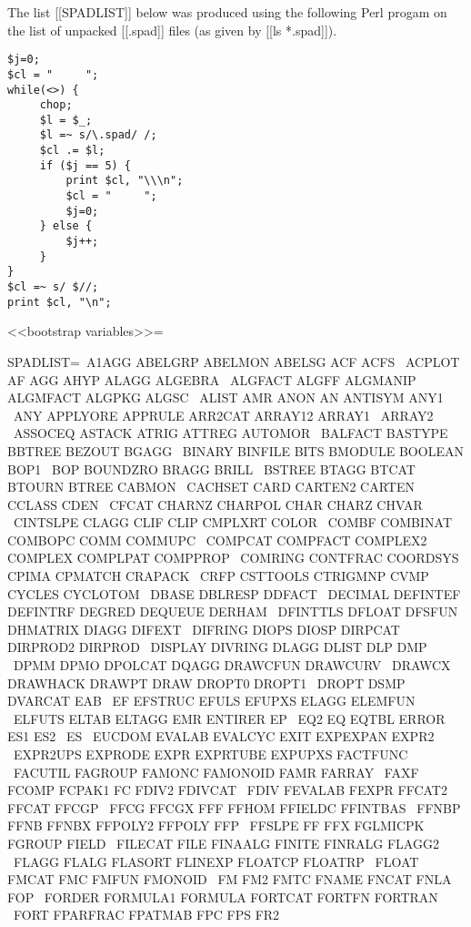 \documentclass{article}
\begin{document}
The list [[SPADLIST]] below was produced using the following Perl
progam on the list of unpacked [[.spad]] files (as given by [[ls *.spad]]).
\begin{verbatim}
$j=0;
$cl = "     ";
while(<>) {
     chop;
     $l = $_;
     $l =~ s/\.spad/ /;
     $cl .= $l;
     if ($j == 5) {
         print $cl, "\\\n";
         $cl = "     ";
         $j=0;
     } else {
         $j++;
     }
}
$cl =~ s/ $//;
print $cl, "\n";
\end{verbatim}

<<bootstrap variables>>=

SPADLIST=\
     A1AGG ABELGRP ABELMON ABELSG ACF ACFS \
     ACPLOT AF AGG AHYP ALAGG ALGEBRA \
     ALGFACT ALGFF ALGMANIP ALGMFACT ALGPKG ALGSC \
     ALIST AMR ANON AN ANTISYM ANY1 \
     ANY APPLYORE APPRULE ARR2CAT ARRAY12 ARRAY1 \
     ARRAY2 \
     ASSOCEQ ASTACK ATRIG ATTREG AUTOMOR \
     BALFACT BASTYPE BBTREE BEZOUT BGAGG \
     BINARY BINFILE BITS BMODULE BOOLEAN BOP1 \
     BOP BOUNDZRO BRAGG BRILL \
     BSTREE BTAGG BTCAT BTOURN BTREE CABMON \
     CACHSET CARD CARTEN2 CARTEN CCLASS CDEN \
     CFCAT CHARNZ CHARPOL CHAR CHARZ CHVAR \
     CINTSLPE CLAGG CLIF CLIP CMPLXRT COLOR \
     COMBF COMBINAT COMBOPC COMM COMMUPC \
     COMPCAT COMPFACT COMPLEX2 COMPLEX COMPLPAT COMPPROP \
     COMRING CONTFRAC COORDSYS CPIMA CPMATCH CRAPACK \
     CRFP CSTTOOLS CTRIGMNP CVMP CYCLES CYCLOTOM \
     DBASE DBLRESP DDFACT \
     DECIMAL DEFINTEF DEFINTRF DEGRED DEQUEUE DERHAM \
     DFINTTLS DFLOAT DFSFUN DHMATRIX DIAGG DIFEXT \
     DIFRING DIOPS DIOSP DIRPCAT DIRPROD2 DIRPROD \
     DISPLAY DIVRING DLAGG DLIST DLP DMP \
     DPMM DPMO DPOLCAT DQAGG DRAWCFUN DRAWCURV \
     DRAWCX DRAWHACK DRAWPT DRAW DROPT0 DROPT1 \
     DROPT DSMP DVARCAT EAB \
     EF EFSTRUC EFULS EFUPXS ELAGG ELEMFUN \
     ELFUTS ELTAB ELTAGG EMR ENTIRER EP \
     EQ2 EQ EQTBL ERROR ES1 ES2 \
     ES \
     EUCDOM EVALAB EVALCYC EXIT EXPEXPAN EXPR2 \
     EXPR2UPS EXPRODE EXPR EXPRTUBE EXPUPXS FACTFUNC \
     FACUTIL FAGROUP FAMONC FAMONOID FAMR FARRAY \
     FAXF FCOMP FCPAK1 FC FDIV2 FDIVCAT \
     FDIV FEVALAB FEXPR FFCAT2 FFCAT FFCGP \
     FFCG FFCGX FFF FFHOM FFIELDC FFINTBAS \
     FFNBP FFNB FFNBX FFPOLY2 FFPOLY FFP \
     FFSLPE FF FFX FGLMICPK FGROUP FIELD \
     FILECAT FILE FINAALG FINITE FINRALG FLAGG2 \
     FLAGG FLALG FLASORT FLINEXP FLOATCP FLOATRP \
     FLOAT FMCAT FMC FMFUN FMONOID \
     FM FM2 FMTC FNAME FNCAT FNLA FOP \
     FORDER FORMULA1 FORMULA FORTCAT FORTFN FORTRAN \
     FORT FPARFRAC FPATMAB FPC FPS FR2 \
\end{document}
